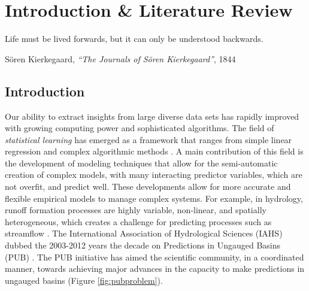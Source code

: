 \chapter{Introduction \& Literature Review}
\setlength{\epigraphwidth}{4.7in}
\epigraph{Life must be lived forwards, but it can only be understood backwards.}{S\"{o}ren Kierkegaard, \textit{``The Journals of S\"{o}ren Kierkegaard''}, 1844}

\section{Introduction}
Our ability to extract insights from large diverse data sets has rapidly improved with growing computing power and sophisticated algorithms. The field of \textit{statistical learning} has emerged as a framework that ranges from simple linear regression and complex algorithmic methods \cite{james2013introduction}. A main contribution of this field is the development of modeling techniques that allow for the semi-automatic creation of complex models, with many interacting predictor variables, which are not overfit, and predict well. These developments allow for more accurate and flexible empirical models to manage complex systems. For example, in hydrology, runoff formation processes are highly variable, non-linear, and spatially heterogeneous, which creates a challenge for predicting processes such as streamflow \cite{dooge1986looking}. The International Association of Hydrological Sciences (IAHS) dubbed the 2003-2012 years the decade on Predictions in Ungauged Basins (PUB) \cite{sivapalan2003iahs}. The PUB initiative has aimed the scientific community, in a coordinated manner, towards achieving major advances in the capacity to make predictions in ungauged basins (Figure \ref{fig:pubproblem}).

